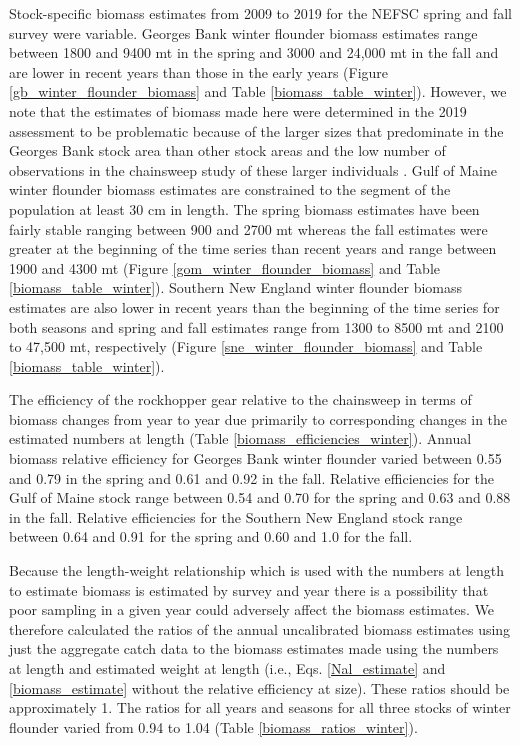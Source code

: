 \documentclass[]{article}
\begin{document}
Stock-specific biomass estimates from 2009 to 2019 for the NEFSC spring
and fall survey were variable. Georges Bank winter flounder biomass
estimates range between 1800 and 9400 mt in the spring and 3000 and
24,000 mt in the fall and are lower in recent years than those in the
early years (Figure \ref{gb_winter_flounder_biomass} and Table
\ref{biomass_table_winter}). However, we note that the estimates of
biomass made here were determined in the 2019 assessment to be
problematic because of the larger sizes that predominate in the Georges
Bank stock area than other stock areas and the low number of
observations in the chainsweep study of these larger individuals
\citep{nefsc2020}. Gulf of Maine winter flounder biomass estimates are
constrained to the segment of the population at least 30 cm in length.
The spring biomass estimates have been fairly stable ranging between 900
and 2700 mt whereas the fall estimates were greater at the beginning of
the time series than recent years and range between 1900 and 4300 mt
(Figure \ref{gom_winter_flounder_biomass} and Table
\ref{biomass_table_winter}). Southern New England winter flounder
biomass estimates are also lower in recent years than the beginning of
the time series for both seasons and spring and fall estimates range
from 1300 to 8500 mt and 2100 to 47,500 mt, respectively (Figure
\ref{sne_winter_flounder_biomass} and Table \ref{biomass_table_winter}).

The efficiency of the rockhopper gear relative to the chainsweep in
terms of biomass changes from year to year due primarily to
corresponding changes in the estimated numbers at length (Table
\ref{biomass_efficiencies_winter}). Annual biomass relative efficiency
for Georges Bank winter flounder varied between 0.55 and 0.79 in the
spring and 0.61 and 0.92 in the fall. Relative efficiencies for the Gulf
of Maine stock range between 0.54 and 0.70 for the spring and 0.63 and
0.88 in the fall. Relative efficiencies for the Southern New England
stock range between 0.64 and 0.91 for the spring and 0.60 and 1.0 for
the fall.

Because the length-weight relationship which is used with the numbers at
length to estimate biomass is estimated by survey and year there is a
possibility that poor sampling in a given year could adversely affect
the biomass estimates. We therefore calculated the ratios of the annual
uncalibrated biomass estimates using just the aggregate catch data to
the biomass estimates made using the numbers at length and estimated
weight at length (i.e., Eqs. \ref{Nal_estimate} and
\ref{biomass_estimate} without the relative efficiency at size). These
ratios should be approximately 1. The ratios for all years and seasons
for all three stocks of winter flounder varied from 0.94 to 1.04 (Table
\ref{biomass_ratios_winter}).
\end{document}
